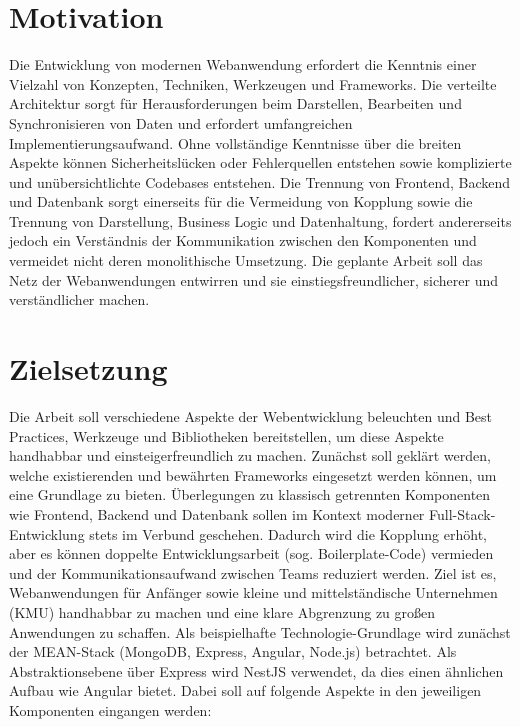 \section*{Motivation}\label{sec:motivation}

Die Entwicklung von modernen Webanwendung erfordert die Kenntnis einer Vielzahl von Konzepten, Techniken, Werkzeugen und Frameworks.
Die verteilte Architektur sorgt für Herausforderungen beim Darstellen, Bearbeiten und Synchronisieren von Daten und erfordert umfangreichen Implementierungsaufwand.
Ohne vollständige Kenntnisse über die breiten Aspekte können Sicherheitslücken oder Fehlerquellen entstehen sowie komplizierte und unübersichtlichte Codebases entstehen.
Die Trennung von Frontend, Backend und Datenbank sorgt einerseits für die Vermeidung von Kopplung sowie die Trennung von Darstellung, Business Logic und Datenhaltung, fordert andererseits jedoch ein Verständnis der Kommunikation zwischen den Komponenten und vermeidet nicht deren monolithische Umsetzung.
Die geplante Arbeit soll das Netz der Webanwendungen entwirren und sie einstiegsfreundlicher, sicherer und verständlicher machen.

\section*{Zielsetzung}\label{sec:zielsetzung}

Die Arbeit soll verschiedene Aspekte der Webentwicklung beleuchten und Best Practices, Werkzeuge und Bibliotheken bereitstellen, um diese Aspekte handhabbar und einsteigerfreundlich zu machen.
Zunächst soll geklärt werden, welche existierenden und bewährten Frameworks eingesetzt werden können, um eine Grundlage zu bieten.
Überlegungen zu klassisch getrennten Komponenten wie Frontend, Backend und Datenbank sollen im Kontext moderner Full-Stack-Entwicklung stets im Verbund geschehen.
Dadurch wird die Kopplung erhöht, aber es können doppelte Entwicklungsarbeit (sog. Boilerplate-Code) vermieden und der Kommunikationsaufwand zwischen Teams reduziert werden.
Ziel ist es, Webanwendungen für Anfänger sowie kleine und mittelständische Unternehmen (KMU) handhabbar zu machen und eine klare Abgrenzung zu großen Anwendungen zu schaffen.
Als beispielhafte Technologie-Grundlage wird zunächst der MEAN-Stack (MongoDB, Express, Angular, Node.js) betrachtet.
Als Abstraktionsebene über Express wird NestJS verwendet, da dies einen ähnlichen Aufbau wie Angular bietet.
Dabei soll auf folgende Aspekte in den jeweiligen Komponenten eingangen werden:

